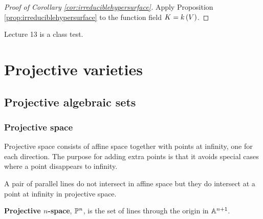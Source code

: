 \begin{proof}[Proof of Corollary \ref{cor:irreduciblehypersurface}]
Apply Proposition \ref{prop:irreduciblehypersurface} to the function field $ K = k\br{V} $.
\end{proof}


Lecture 13 is a class test.

\pagebreak

\section{Projective varieties}

\subsection{Projective algebraic sets}

\subsubsection{Projective space}


Projective space consists of affine space together with points at infinity, one for each direction. The purpose for adding extra points is that it avoids special cases where a point disappears to infinity.

\begin{example*}
A pair of parallel lines do not intersect in affine space but they do intersect at a point at infinity in projective space.
\end{example*}

\begin{definition*}
\textbf{Projective $ n $-space}, $ \PP^n $, is the set of lines through the origin in $ \AA^{n + 1} $.
\end{definition*}

